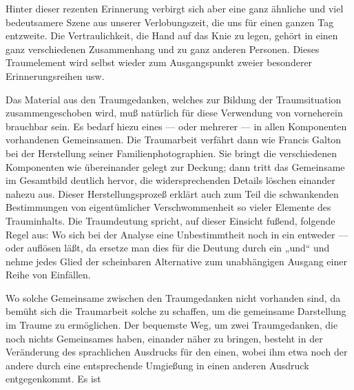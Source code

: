 \documentclass{article}
\begin{document}
         
            
            
            
        \pstart
        Hinter dieser rezenten Erinnerung verbirgt sich aber eine ganz
               ähnliche und viel bedeutsamere Szene aus unserer Verlobungszeit, die uns für
               einen ganzen Tag entzweite. Die Vertraulichkeit, die Hand auf das Knie zu legen,
               gehört in einen ganz verschiedenen Zusammenhang und zu ganz anderen Personen.
               Dieses Traumelement wird selbst wieder zum Ausgangspunkt zweier
               besonderer Erinnerungsreihen usw.
        \pend
    
            
        \pstart
        Das Material aus den Traumgedanken, welches zur Bildung der Traumsituation
               zusammengeschoben wird, muß natürlich für diese Verwendung von vorneherein
               brauchbar sein. Es bedarf hiezu eines — oder mehrerer — in allen Komponenten
                  vorhandenen Gemeinsamen. Die
               Traumarbeit verfährt dann wie
               Francis Galton bei der Herstellung seiner
                  Familienphotographien. Sie bringt die verschiedenen Komponenten
               wie übereinander gelegt zur Deckung; dann tritt das Gemeinsame
               im Gesamtbild deutlich hervor, die widersprechenden Details löschen
               einander nahezu aus. Dieser Herstellungsprozeß erklärt auch zum Teil die
               schwankenden Bestimmungen von eigentümlicher Verschwommenheit so
               vieler Elemente des Trauminhalts. Die Traumdeutung spricht, auf
               dieser Einsicht fußend, folgende Regel aus: Wo sich bei der Analyse eine Unbestimmtheit noch in ein entweder — oder
               auflösen läßt, da ersetze man dies für die Deutung durch ein „und“ und nehme jedes Glied der scheinbaren
               Alternative zum unabhängigen Ausgang einer Reihe von Einfällen.
        \pend
    
            
        \pstart
        Wo solche Gemeinsame zwischen den Traumgedanken
               nicht vorhanden sind, da bemüht sich die Traumarbeit solche zu schaffen, um die gemeinsame Darstellung im Traume zu
               ermöglichen. Der bequemste Weg, um zwei Traumgedanken, die noch nichts
               Gemeinsames haben, einander näher zu bringen, besteht in der Veränderung des
               sprachlichen Ausdrucks für den einen, wobei ihm etwa noch der andere durch eine
               entsprechende Umgießung in einen anderen Ausdruck entgegenkommt. Es ist
        \pend
    
\end{document}
